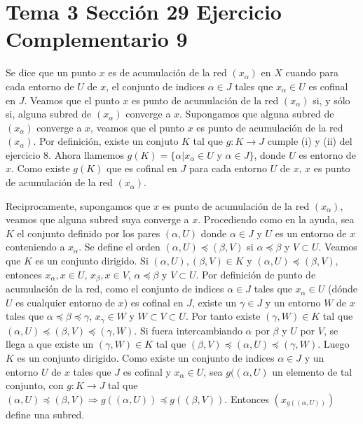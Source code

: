 \documentclass{article}
\begin{document}
\section{Tema 3 Sección 29 Ejercicio Complementario 9}
Se dice que un punto $x$ es de acumulación de la red $(x_\alpha)$ en $X$ cuando para cada entorno de $U$ de $x$, el conjunto de indices $\alpha \in J$ tales que $x_\alpha \in U$ es cofinal en $J$. Veamos que el punto $x$ es punto de acumulación de la red $(x_\alpha)$ si, y sólo si, alguna subred de $(x_\alpha)$ converge a $x$.
Supongamos que  alguna subred de $(x_\alpha)$ converge a $x$, veamos que el punto $x$ es punto de acumulación de la red $(x_\alpha)$. Por definición, existe un conjuto $K$ tal que $g:K\rightarrow J$ cumple (i) y (ii) del ejercicio 8. Ahora llamemos $g(K)=\{\alpha| x_\alpha \in U \text{ y } \alpha\in J\}$, donde $U$ es entorno de $x$. Como existe $g(K)$ que es cofinal en $J$ para cada entorno $U$ de $x$, $x$ es punto de acumulación de la red $(x_\alpha)$.

Reciprocamente, supongamos que $x$ es punto de acumulación de la red $(x_\alpha)$, veamos que alguna subred suya converge a $x$. Procediendo como en la ayuda, sea $K$ el conjunto definido por los pares $(\alpha,U)$ donde $\alpha \in J$ y $U$ es un entorno de $x$ conteniendo a $x_\alpha$. Se define el orden $(\alpha,U)\preceq (\beta,V)$ si $\alpha\preceq \beta$ y $V\subset U$. Veamos que $K$ es un conjunto dirigido. Si $(\alpha, U), (\beta,V)\in K$ y $(\alpha, U)\preceq (\beta,V)$, entonces $x_\alpha,x\in U$, $x_\beta,x\in V$, $\alpha\preceq \beta$ y $V\subset U$. Por definición de punto de acumulación de la red, como el conjunto de indices $\alpha\in J$ tales que $x_\alpha\in U$ (dónde $U$ es cualquier entorno de $x$) es cofinal en $J$, existe un $\gamma\in J$ y un entorno $W$ de $x$ tales que $\alpha\preceq \beta\preceq \gamma$, $x_\gamma\in W$ y $W\subset V\subset U$. Por tanto existe $(\gamma, W)\in K$ tal que $(\alpha,U)\preceq (\beta, V)\preceq (\gamma, W)$. Si fuera intercambiando $\alpha$ por $\beta$ y $U$ por $V$, se llega a que existe un $(\gamma, W)\in K$ tal que $(\beta,V)\preceq (\alpha, U)\preceq (\gamma, W)$. Luego $K$ es un conjunto dirigido. Como existe un conjunto de indices $\alpha\in J$ y un entorno $U$ de $x$ tales que $J$ es cofinal y $x_\alpha\in U$, sea $g((\alpha,U)$ un elemento de tal conjunto, con $g:K\rightarrow J$ tal que $(\alpha,U)\preceq (\beta, V)\Rightarrow g((\alpha,U))\preceq g((\beta, V))$. Entonces $(x_{g((\alpha, U))})$ define una subred.
\end{document}
